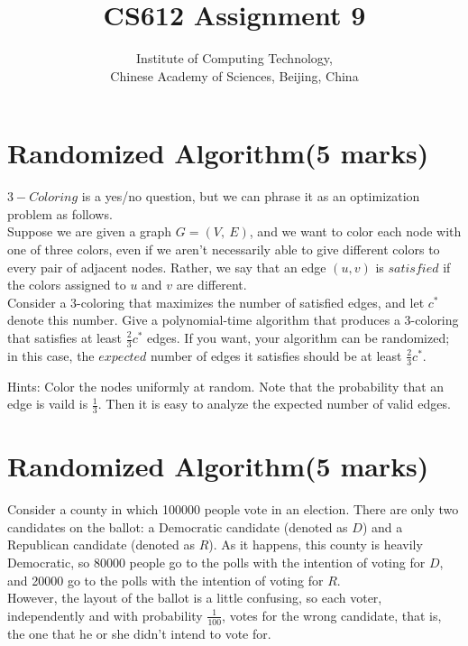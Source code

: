 \documentclass[a4paper,11pt]{article}
\title{CS612 Assignment 9}
\author{Institute of Computing Technology, \\
                       Chinese Academy of Sciences, Beijing, China }
\begin{document}
\maketitle


\section{Randomized Algorithm(5 marks)}

$3-Coloring$ is a yes/no question, but we can phrase it as an optimization problem as follows.\\

	Suppose we are given a graph $G=(V,\ E)$, and we want to color each node with one of three colors, even if we aren't necessarily able to give different colors to every pair of adjacent nodes. Rather, we say that an edge $(u,v)$ is $satisfied$ if the colors assigned to $u$ and $v$ are different.\\

	Consider a 3-coloring that maximizes the number of satisfied edges, and let $c^*$ denote this number. Give a polynomial-time algorithm that produces a 3-coloring that satisfies at least $\frac{2}{3} c^*$ edges. If you want, your algorithm can be randomized; in this case, the $expected$ number of edges it satisfies should be at least $\frac{2}{3} c^*$.


Hints: Color the nodes uniformly at random. Note that the probability that an edge is vaild is $\frac{1}{3}$. Then it is easy to analyze the expected number of valid edges. 


\section{Randomized Algorithm(5 marks)}

Consider a county in which 100000 people vote in an election. There are only two candidates on the ballot: a Democratic candidate (denoted as $D$) and a Republican candidate (denoted as $R$). As it happens, this county is heavily Democratic, so 80000 people go to the polls with the intention of voting for $D$, and 20000 go to the polls with the intention of voting for $R$.\\

		 However, the layout of the ballot is a little confusing, so each voter, independently and with probability $\frac{1}{100}$, votes for the wrong candidate, that is, the one that he or she didn't intend to vote for.\\
\end{document}
